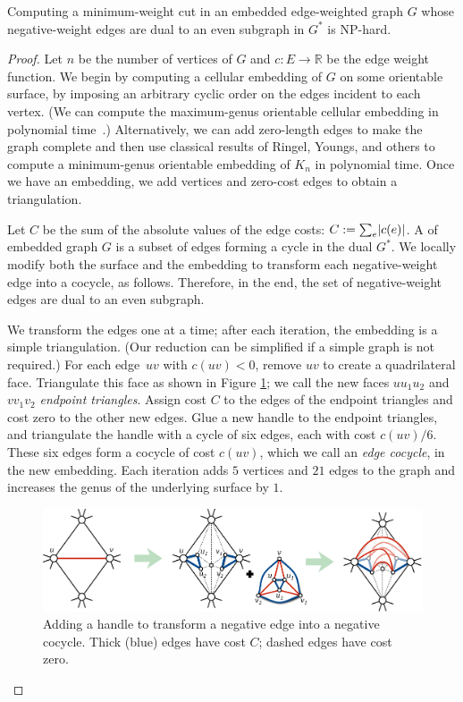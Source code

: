 \documentclass[letterpaper,review]{siamart190516}
\def\Real{\mathbb{R}}
\begin{document}
{\begin{lemma}
Computing a minimum-weight cut in an embedded edge-weighted graph $G$ whose negative-weight edges are dual to an even subgraph in $G^*$
is NP-hard.
\end{lemma}
\begin{proof}
Let $n$ be the number of vertices of $G$ and $c\colon E\to \Real$ be the edge weight function.  We begin by computing a cellular embedding of $G$ on some orientable surface, by imposing an arbitrary cyclic order on the edges incident to each vertex.
(We can compute the maximum-genus orientable cellular embedding  in polynomial time~\cite{fgm-fmggi-88}.)  Alternatively, we can add zero-length edges to make the graph complete and then use classical results of Ringel, Youngs, and others \cite{ry-shmcp-68,r-mct-74} to compute a minimum-genus orientable embedding of $K_n$ in polynomial time.  Once we have an embedding, we add vertices and zero-cost edges to obtain a triangulation.

Let $C$ be the sum of the absolute values of the edge costs: $C:= \sum_e \mathopen| c(e) \mathclose|$.
A  of embedded graph $G$ is a subset of edges forming a cycle in the dual $G^*$.
We locally modify both the surface and the embedding to transform each negative-weight edge into a cocycle, as follows.  Therefore, in the end, the set of negative-weight edges are dual to an even subgraph.

We transform the edges one at a time; after each iteration, the embedding is a simple triangulation.  (Our reduction can be simplified if a simple graph is not required.)  For each edge~$uv$ with $c(uv)<0$, remove $uv$ to create a quadrilateral face.  Triangulate this face as shown in Figure \ref{fig:addhandle}; we call the new faces $uu_1u_2$ and $vv_1v_2$ \emph{endpoint triangles}.  Assign cost $C$ to the edges of the endpoint triangles and cost zero to the other new edges. Glue a new handle to the endpoint triangles, and triangulate the handle with a cycle of six edges, each with cost $c(uv)/6$.  These six edges form a cocycle of cost $c(uv)$, which we call an \emph{edge cocycle}, in the new embedding.  Each iteration adds $5$ vertices and $21$ edges to the graph and increases the genus of the underlying surface by $1$.

\begin{figure}[hbt]
\centering\includegraphics[scale=0.4]{Fig/addhandle3}
\caption{Adding a handle to transform a negative edge into a negative cocycle.  Thick (blue) edges have cost $C$; dashed edges have cost zero.}
\label{fig:addhandle}
\end{figure}


\end{proof}}
\end{document}
